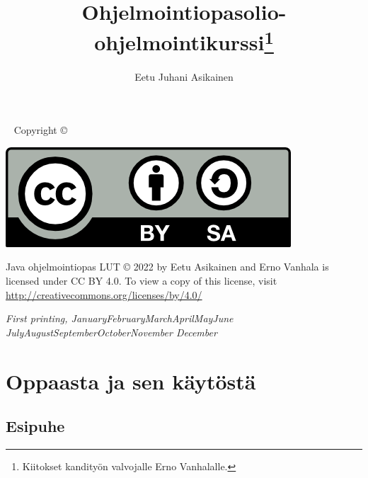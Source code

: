 \documentclass[a4paper,justified,notoc]{tufte-book}
\title{Ohjelmointiopas{\small \lutin olio-ohjelmointikurssi}\thanks{Kiitokset kandityön valvojalle
Erno Vanhalalle.}}
\author[Eetu Juhani Asikainen]{Eetu Juhani Asikainen}
\newcommand{\monthyear}{
  \ifcase\month\or January\or February\or March\or April\or May\or June\or
  July\or August\or September\or October\or November\or
  December\fi\space\number\year
}
\begin{document}
\frontmatter

\maketitle

\newpage
\begin{fullwidth}
~\vfill
\thispagestyle{empty}
\setlength{\parindent}{0pt}
\setlength{\parskip}{\baselineskip}
Copyright \copyright\ \the\year\ \thanklessauthor

\par{}

\par{}

\includegraphics[scale=1]{cc-by-sa}

\par Java ohjelmointiopas LUT © 2022 by Eetu Asikainen and Erno Vanhala is licensed under CC BY 4.0. To view a copy of this license, visit \url{http://creativecommons.org/licenses/by/4.0/}

\par\textit{First printing, \monthyear}

\tableofcontents
\listoflistings


\chapter{Oppaasta ja sen käytöstä}
\label{oppaasta}


\section{Esipuhe}
\label{esipuhe}


\end{fullwidth}
\end{document}
